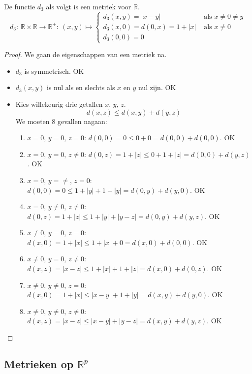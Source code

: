\documentclass[main.tex]{subfiles}
\begin{document}
\begin{vb}
  De functie $d_{3}$ als volgt is een metriek voor $\mathbb{R}$.
  \[
  d_{3}:\ \mathbb{R} \times \mathbb{R} \rightarrow \mathbb{R}^{+}:\ (x,y) \mapsto
  \begin{cases}
    d_{3}(x,y) = |x-y| &\text{ als } x\neq 0 \neq y\\
    d_{3}(x,0) = d(0,x) = 1 + |x| &\text{ als } x \neq 0\\
    d_{3}(0,0) = 0
  \end{cases}
  \]

  \begin{proof}
    We gaan de eigenschappen van een metriek na.
    \begin{itemize}
    \item $d_{3}$ is symmetrisch. OK
    \item $d_{3}(x,y)$ is nul als en slechts als $x$ en $y$ nul zijn. OK
    \item Kies willekeurig drie getallen $x$, $y$, $z$.
      \[ d(x,z) \le d(x,y) + d(y,z) \]
      We moeten $8$ gevallen nagaan:
      \begin{enumerate}
      \item $x=0$, $y=0$, $z=0$: $d(0,0) = 0 \le 0 + 0 = d(0,0) + d(0,0)$. OK
      \item $x=0$, $y=0$, $z\neq0$: $d(0,z) = 1 + |z| \le 0 + 1 + |z| = d(0,0) + d(y,z)$. OK 
      \item $x=0$, $y=\neq$, $z=0$: $d(0,0) = 0 \le 1+|y| + 1+|y| = d(0,y) + d(y,0)$. OK
      \item $x=0$, $y\neq0$, $z\neq0$: $d(0,z) = 1+ |z| \le 1+|y| + |y-z| = d(0,y) + d(y,z)$. OK
      \item $x\neq0$, $y=0$, $z=0$: $d(x,0) = 1+|x| \le 1+|x| + 0 = d(x,0) + d(0,0)$. OK
      \item $x\neq0$, $y=0$, $z\neq0$: $d(x,z) = |x-z| \le 1+|x| + 1+|z| = d(x,0) + d(0,z)$. OK
      \item $x\neq0$, $y\neq0$, $z=0$: $d(x,0) = 1+|x| \le |x-y| + 1+|y| = d(x,y) + d(y,0)$. OK
      \item $x\neq0$, $y\neq0$, $z\neq0$: $d(x,z) = |x-z| \le |x-y| + |y-z| = d(x,y) + d(y,z)$. OK
      \end{enumerate}
    \end{itemize}
  \end{proof}
\end{vb}


\subsection{Metrieken op $\mathbb{R}^p$}
\label{sec:metr-op-mathbbrp}
\end{document}
